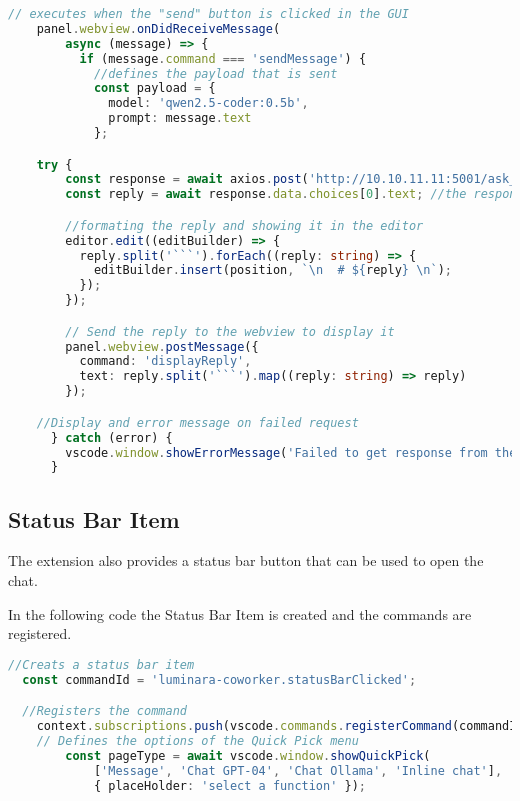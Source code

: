 \begin{lstlisting}[language=TypeScript, caption={Axios request}]
    // executes when the "send" button is clicked in the GUI
    panel.webview.onDidReceiveMessage(
        async (message) => {
          if (message.command === 'sendMessage') {
            //defines the payload that is sent
            const payload = {
              model: 'qwen2.5-coder:0.5b',
              prompt: message.text
            };  

    try {
        const response = await axios.post('http://10.10.11.11:5001/ask_programming_bot', payload ); //Selecting the endpoint for the request and sending the payload. 
        const reply = await response.data.choices[0].text; //the response is then stored in the "reply" variable

        //formating the reply and showing it in the editor
        editor.edit((editBuilder) => {
          reply.split('```').forEach((reply: string) => {
            editBuilder.insert(position, `\n  # ${reply} \n`);
          });
        });

        // Send the reply to the webview to display it
        panel.webview.postMessage({
          command: 'displayReply',
          text: reply.split('```').map((reply: string) => reply)
        });

    //Display and error message on failed request
      } catch (error) {
        vscode.window.showErrorMessage('Failed to get response from the server.');
      }

\end{lstlisting}

\subsection{Status Bar Item} 

The extension also provides a status bar button that can be used to open the chat.

In the following code the Status Bar Item is created and the commands are registered.

\begin{lstlisting}[language=TypeScript, caption={Status Bar}]
  //Creats a status bar item
  const commandId = 'luminara-coworker.statusBarClicked';

  //Registers the command
	context.subscriptions.push(vscode.commands.registerCommand(commandId, async () => {
    // Defines the options of the Quick Pick menu
		const pageType = await vscode.window.showQuickPick(
			['Message', 'Chat GPT-04', 'Chat Ollama', 'Inline chat'],
			{ placeHolder: 'select a function' });
\end{lstlisting}

